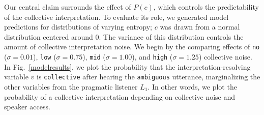 \documentclass[preprint,12pt,authoryear,titlepage]{elsarticle}
\begin{document}
Our central claim surrounds the effect of $P(c)$, which controls the predictability of the collective interpretation. To evaluate its role, we generated model predictions for distributions of varying entropy; $c$ was drawn from a normal distribution centered around $0$. The variance of this distribution controls the amount of collective interpretation noise. We begin by the comparing effects of \texttt{no} ($\sigma=0.01$), \texttt{low} ($\sigma=0.75$), \texttt{mid} ($\sigma=1.00$), and \texttt{high} ($\sigma=1.25$) collective noise.
%
%
In Fig.~\ref{modelresults}, we plot the probability that the interpretation-resolving variable $v$ is \texttt{collective} after hearing the \texttt{ambiguous} utterance, marginalizing the other variables from the pragmatic listener $L_1$. In other words, we plot the probability of a collective interpretation depending on collective noise and speaker access.%

\end{document}
